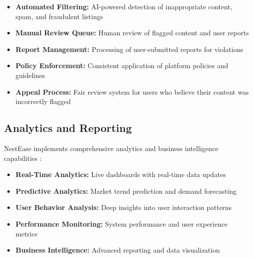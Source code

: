 \documentclass[conference]{IEEEtran}
\begin{document}
\begin{itemize}
    \item \textbf{Automated Filtering:} AI-powered detection of inappropriate content, spam, and fraudulent listings
    \item \textbf{Manual Review Queue:} Human review of flagged content and user reports
    \item \textbf{Report Management:} Processing of user-submitted reports for violations
    \item \textbf{Policy Enforcement:} Consistent application of platform policies and guidelines
    \item \textbf{Appeal Process:} Fair review system for users who believe their content was incorrectly flagged
\end{itemize}

\subsection{Analytics and Reporting}
NestEase implements comprehensive analytics and business intelligence capabilities \cite{data_analytics}:

\begin{itemize}
    \item \textbf{Real-Time Analytics:} Live dashboards with real-time data updates
    \item \textbf{Predictive Analytics:} Market trend prediction and demand forecasting
    \item \textbf{User Behavior Analysis:} Deep insights into user interaction patterns
    \item \textbf{Performance Monitoring:} System performance and user experience metrics
    \item \textbf{Business Intelligence:} Advanced reporting and data visualization
\end{itemize}
\end{document}
